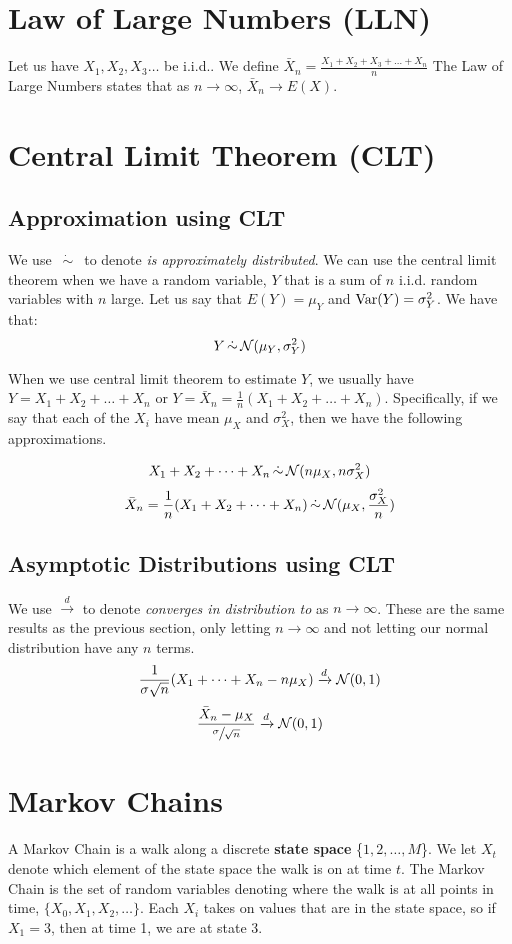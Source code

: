 \documentclass[11.5pt]{article}
\begin{document}
\begin{notes}
\section*{Law of Large Numbers (LLN)}
Let us have $X_1, X_2, X_3 \dots$ be i.i.d.. We define $\bar{X}_n = \frac{X_1 + X_2 + X_3 + \dots + X_n}{n}$ The Law of Large Numbers states that as $n \longrightarrow \infty$, $\bar{X}_n \longrightarrow E(X)$.

\section*{Central Limit Theorem (CLT)}
\subsection*{Approximation using CLT}
We use $\dot{\,\sim\,}$ to denote \emph{is approximately distributed}. We can use the central limit theorem when we have a random variable, $Y$ that is a sum of $n$ i.i.d. random variables with $n$ large. Let us say that $E(Y) = \mu_Y$ and $\textrm{Var}(Y) = \sigma^2_Y$. We have that:
\[Y \dot{\,\sim\,} \mathcal{N}(\mu_Y, \sigma^2_Y)\]

When we use central limit theorem to estimate $Y$, we usually have $Y = X_1 + X_2 + \dots + X_n$ or $Y = \bar{X}_n= \frac{1}{n}(X_1 + X_2 + \dots + X_n)$. Specifically, if we say that each of the $X_i$ have mean $\mu_X$ and $\sigma^2_X$, then we have the following approximations.

\[ X_1 + X_2 + \dots + X_n \dot{\,\sim\,} \mathcal{N}(n\mu_X, n\sigma^2_X) \]
\[ \bar{X}_n = \frac{1}{n}(X_1 + X_2 + \dots + X_n) \dot{\,\sim\,} \mathcal{N}(\mu_X, \frac{\sigma^2_X}{n}) \]


\subsection*{Asymptotic Distributions using CLT}

We use $\xrightarrow{d}$ to denote \emph{converges in distribution to} as $n \longrightarrow \infty$. These are the same results as the previous section, only letting $n \longrightarrow \infty$ and not letting our normal distribution have any $n$ terms.
\[\frac{1}{\sigma\sqrt{n}} (X_1 + \dots + X_n - n\mu_X) \xrightarrow{d} \mathcal{N}(0, 1)\]
\[\frac{\bar{X}_n - \mu_X}{\sfrac{\sigma}{\sqrt{n}}} \xrightarrow{d} \mathcal{N}(0, 1)\]


\section*{Markov Chains}
A Markov Chain is a walk along a discrete \textbf{state space} \{$1, 2, \dots, M$\}. We let $X_t$ denote which element of the state space the walk is on at time $t$. The Markov Chain is the set of random variables denoting where the walk is at all points in time, $\{X_0, X_1, X_2, \dots \}$. Each $X_i$ takes on values that are in the state space, so if $X_1 = 3$, then at time 1, we are at state 3. 


\end{notes}
\end{document}
